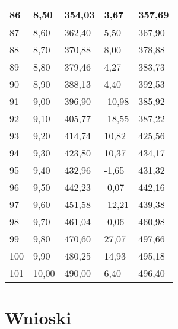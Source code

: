 \documentclass{article}
\begin{document}
\begin{longtable}{|l|l|l|l|l|}
    86 & 8,50 & 354,03 & 3,67 & 357,69 \\ \hline
    87 & 8,60 & 362,40 & 5,50 & 367,90 \\ \hline
    88 & 8,70 & 370,88 & 8,00 & 378,88 \\ \hline
    89 & 8,80 & 379,46 & 4,27 & 383,73 \\ \hline
    90 & 8,90 & 388,13 & 4,40 & 392,53 \\ \hline
    91 & 9,00 & 396,90 & -10,98 & 385,92 \\ \hline
    92 & 9,10 & 405,77 & -18,55 & 387,22 \\ \hline
    93 & 9,20 & 414,74 & 10,82 & 425,56 \\ \hline
    94 & 9,30 & 423,80 & 10,37 & 434,17 \\ \hline
    95 & 9,40 & 432,96 & -1,65 & 431,32 \\ \hline
    96 & 9,50 & 442,23 & -0,07 & 442,16 \\ \hline
    97 & 9,60 & 451,58 & -12,21 & 439,38 \\ \hline
    98 & 9,70 & 461,04 & -0,06 & 460,98 \\ \hline
    99 & 9,80 & 470,60 & 27,07 & 497,66 \\ \hline
    100 & 9,90 & 480,25 & 14,93 & 495,18 \\ \hline
    101 & 10,00 & 490,00 & 6,40 & 496,40 \\ \hline
\end{longtable}

\section{Wnioski}
\end{document}

